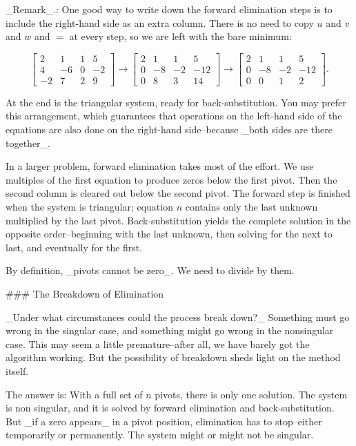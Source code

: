 _Remark_.: One good way to write down the forward elimination steps is to include the right-hand side as an extra column. There is no need to copy \(u\) and \(v\) and \(w\) and \(=\) at every step, so we are left with the bare minimum:

\[\begin{bmatrix}2&1&1&5\\ 4&-6&0&-2\\ -2&7&2&9\end{bmatrix}\longrightarrow\begin{bmatrix}2&1&1&5\\ 0&-8&-2&-12\\ 0&8&3&14\end{bmatrix}\longrightarrow\begin{bmatrix}2&1&1&5\\ 0&-8&-2&-12\\ 0&0&1&2\end{bmatrix}.\]

At the end is the triangular system, ready for back-substitution. You may prefer this arrangement, which guarantees that operations on the left-hand side of the equations are also done on the right-hand side--because _both sides are there together_.

In a larger problem, forward elimination takes most of the effort. We use multiples of the first equation to produce zeros below the first pivot. Then the second column is cleared out below the second pivot. The forward step is finished when the system is triangular; equation \(n\) contains only the last unknown multiplied by the last pivot. Back-substitution yields the complete solution in the opposite order--beginning with the last unknown, then solving for the next to last, and eventually for the first.

By definition, _pivots cannot be zero_. We need to divide by them.

### The Breakdown of Elimination

_Under what circumstances could the process break down?_ Something must go wrong in the singular case, and something might go wrong in the nonsingular case. This may seem a little premature--after all, we have barely got the algorithm working. But the possibility of breakdown sheds light on the method itself.

The answer is: With a full set of \(n\) pivots, there is only one solution. The system is non singular, and it is solved by forward elimination and back-substitution. But _if a zero appears_ in a pivot position, elimination has to stop--either temporarily or permanently. The system might or might not be singular.

